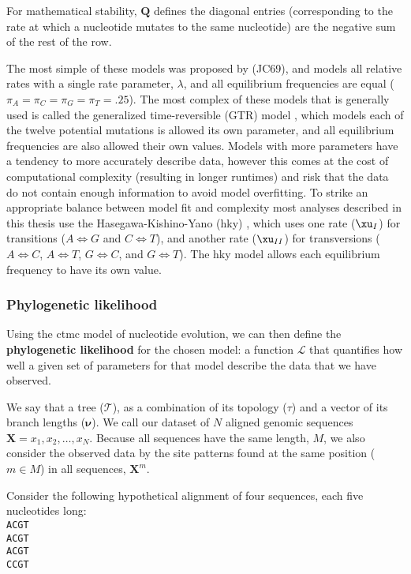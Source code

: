 For mathematical stability, $\mathbf{Q}$ defines the diagonal entries (corresponding to the rate at which a nucleotide mutates to the same nucleotide) are the negative sum of the rest of the row.

The most simple of these models was proposed by \citet{jukes1969evolution} (JC69), and models all relative rates with a single rate parameter, $\lambda$, and all equilibrium frequencies are equal ($\pi_A = \pi_C = \pi_G = \pi_T = .25$).
The most complex of these models that is generally used is called the generalized time-reversible (GTR) model \citep{tavare1986some}, which models each of the twelve potential mutations is allowed its own parameter, and all equilibrium frequencies are also allowed their own values.
Models with more parameters have a tendency to more accurately describe data, however this comes at the cost of computational complexity (resulting in longer runtimes) and risk that the data do not contain enough information to avoid model overfitting.
To strike an appropriate balance between model fit and complexity most analyses described in this thesis use the Hasegawa-Kishino-Yano (\gls{hky}) \citep{hasegawa1985dating}, which uses one rate ($\xu_I$) for transitions ($A \iff G$ and $C \iff T$), and another rate ($\xu_{II}$) for transversions ($A \iff C$, $A \iff T$, $G \iff C$, and $G \iff T$).
The \gls{hky} model allows each equilibrium frequency to have its own value.

\subsubsection{Phylogenetic likelihood}
Using the \gls{ctmc} model of nucleotide evolution, we can then define the \textbf{phylogenetic likelihood} for the chosen model: a function $\mathcal{L}$ that quantifies how well a given set of parameters for that model describe the data that we have observed.

We say that a tree ($\mathcal{T}$), as a combination of its topology ($\tau$) and a vector of its branch lengths ($\mathbf{\nu}$).
We call our dataset of $N$ aligned genomic sequences $\mathbf{X} = {x_1, x_2, \dots, x_N}$.
Because all sequences have the same length, $M$, we also consider the observed data by the site patterns found at the same position ($m \in M$) in all sequences, $\mathbf{X}^m$.

\clearpage
Consider the following hypothetical alignment of four sequences, each five nucleotides long:\\
\verb|ACGT|\\
\verb|ACGT|\\
\verb|ACGT|\\
\verb|CCGT|\\

